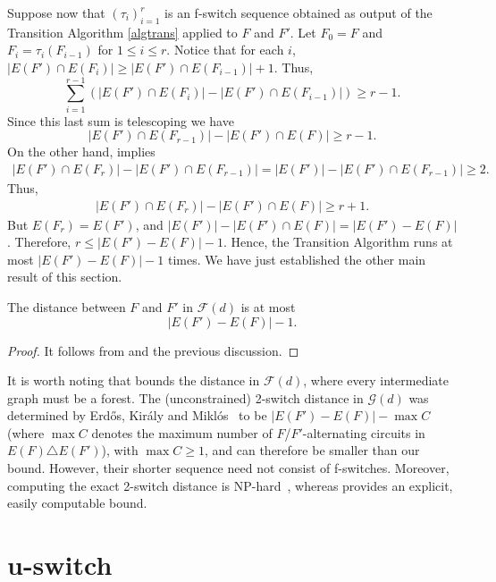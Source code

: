 \documentclass{BICA}
\begin{document}
Suppose now that $(\tau_{i})_{i=1}^{r}$ is an f-switch sequence obtained as output of the Transition Algorithm \eqref{algtrans} applied to \(F\) and \(F'\). Let $F_0=F$ and $F_i=\tau_i(F_{i-1})$ for $1\leq i \leq r$.
Notice that for each $i$,  $|E(F')\cap E(F_i)|\geq |E(F')\cap E(F_{i-1})|+1$. Thus,
\[
\sum_{i=1}^{r-1}\left( |E(F')\cap E(F_i)|-|E(F')\cap E(F_{i-1})| \right) \geq r-1.
\]
Since this last sum is telescoping we have
\[
|E(F')\cap E(F_{r-1})|-|E(F')\cap E(F)|\geq r-1.
\]
On the other hand,  implies
\begin{align*}
|E(F')\cap E(F_{r})|-|E(F')\cap E(F_{r-1})|=|E(F')|-|E(F')\cap E(F_{r-1})|\geq 2.
\end{align*}
Thus, 
\begin{align*}
|E(F')\cap E(F_{r})|-|E(F')\cap E(F)|\geq r+1.
\end{align*}
But $E(F_{r})=E(F')$, and $|E(F')|-|E(F')\cap E(F)|=|E(F')-E(F)|$. Therefore, $r\leq |E(F')-E(F)|-1$.
Hence, the Transition Algorithm runs at most $|E(F')-E(F)|-1$ times. We have just established the other main result of this section.
\begin{theorem}
	\label{transbosques}
	The distance between $F$ and $F'$ in $\mathcal{F}(d)$ is at most
	\[ |E(F')-E(F)|-1. \]
\end{theorem}

\begin{proof}
	It follows from  and the previous discussion.
\end{proof}

It is worth noting that  bounds the distance in $\mathcal{F}(d)$, where every intermediate graph must be a forest. The (unconstrained) 2-switch distance in $\mathcal{G}(d)$ was determined by Erd\H{o}s, Kir\'aly and Mikl\'os~\cite{ErdosKiralyMiklos} to be $|E(F')-E(F)|-\max C$ (where $\max C$ denotes the maximum number of $F$/$F'$-alternating circuits in $E(F)\triangle E(F')$), with $\max C\ge 1$, and can therefore be smaller than our bound. However, their shorter sequence need not consist of f-switches. Moreover, computing the exact 2-switch distance is NP-hard~\cite{BeregIto}, whereas  provides an explicit, easily computable bound.

\section{u-switch} \label{sec-u-switch}
\end{document}

